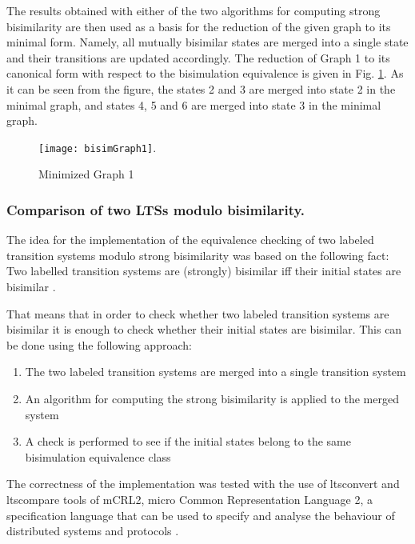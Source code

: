 The results obtained with either of the two algorithms for computing strong bisimilarity are then used as a basis for the reduction of the given graph to its minimal form. Namely, all mutually bisimilar states are merged into a single state and their transitions are updated accordingly. The reduction of Graph 1 to its canonical form with respect to the bisimulation equivalence is given in Fig.  \ref{fig:bisimGraph1}. As it can be seen from the figure, the states 2 and 3 are merged into state 2 in the minimal graph, and states 4, 5 and 6 are merged into state 3 in the minimal graph.

\begin{figure}[!ht]
\centering
\texttt{[image: bisimGraph1]}.
\caption{Minimized Graph 1}
\label{fig:bisimGraph1}
\end{figure}

\subsubsection{Comparison of two LTSs modulo bisimilarity.}
The idea for the implementation of the equivalence checking of two labeled transition systems modulo strong bisimilarity was based on the following fact: Two labelled transition systems are (strongly) bisimilar iff their initial states are bisimilar \cite{ModellingAndAnalysis}.

That means that in order to check whether two labeled transition systems are bisimilar it is enough to check whether their initial states are bisimilar. This can be done using the following approach:
\begin{enumerate}
	\item The two labeled transition systems are merged into a single transition system
	\item An algorithm for computing the strong bisimilarity is applied to the merged system
	\item A check is performed to see if the initial states belong to the same bisimulation equivalence class
\end{enumerate}

The correctness of the implementation was tested with the use of ltsconvert and ltscompare tools of mCRL2, micro Common Representation Language 2, a specification language that can be used to specify and analyse the behaviour of distributed systems and protocols
\cite{mCRL2Ref}.
